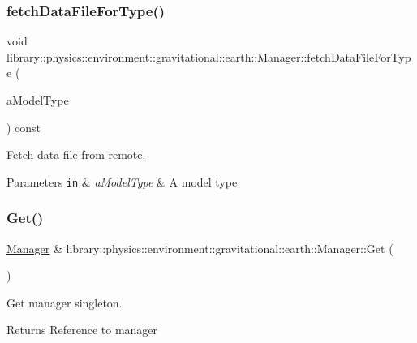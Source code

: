 \subsubsection{\texorpdfstring{fetch\+Data\+File\+For\+Type()}{fetchDataFileForType()}}
{\footnotesize\ttfamily void library\+::physics\+::environment\+::gravitational\+::earth\+::\+Manager\+::fetch\+Data\+File\+For\+Type (\begin{DoxyParamCaption}\item[{const \hyperlink{classlibrary_1_1physics_1_1environment_1_1gravitational_1_1_earth_ab20a2b260831c66ac10f7b9a307d25ca}{Earth\+Gravitational\+Model\+::\+Type} \&}]{a\+Model\+Type }\end{DoxyParamCaption}) const}



Fetch data file from remote. 


\begin{DoxyParams}[1]{Parameters}
\mbox{\tt in}  & {\em a\+Model\+Type} & A model type \\
\hline
\end{DoxyParams}
\mbox{\label{classlibrary_1_1physics_1_1environment_1_1gravitational_1_1earth_1_1_manager_a17dbce5f18754f96fc83819d8e209884}} 
\subsubsection{\texorpdfstring{Get()}{Get()}}
{\footnotesize\ttfamily \hyperlink{classlibrary_1_1physics_1_1environment_1_1gravitational_1_1earth_1_1_manager}{Manager} \& library\+::physics\+::environment\+::gravitational\+::earth\+::\+Manager\+::\+Get (\begin{DoxyParamCaption}{ }\end{DoxyParamCaption})\hspace{0.3cm}{\ttfamily [static]}}



Get manager singleton. 

\begin{DoxyReturn}{Returns}
Reference to manager 
\end{DoxyReturn}
\mbox{\label{classlibrary_1_1physics_1_1environment_1_1gravitational_1_1earth_1_1_manager_af485913053b7f7f65829a804baadc8b0}} 
